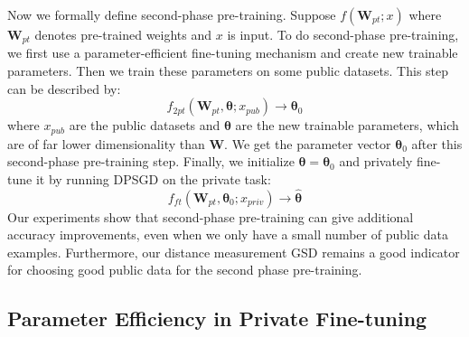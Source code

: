 \documentclass[11pt]{article}
\renewcommand{\epsilon}{\varepsilon}
\begin{document}
Now we formally define second-phase pre-training. Suppose $f(\mathbf{W}_{pt}; x)$ where $\mathbf{W}_{pt}$ denotes pre-trained weights and $x$ is input. To do second-phase pre-training, we first use a parameter-efficient fine-tuning mechanism and create new trainable parameters. Then we train these parameters on some public datasets. This step can be described by:
\begin{equation}
    f_{2pt}\left(\mathbf{W}_{pt}, \mathbf{\theta}; x_{pub}\right) \rightarrow \mathbf{\theta}_0
\end{equation}
where $x_{pub}$ are the public datasets and $\mathbf{\theta}$ are the new trainable parameters, which are of far lower dimensionality than $\mathbf{W}$. We get the parameter vector $\mathbf{\theta}_0$ after this second-phase pre-training step. Finally, we initialize $\mathbf{\theta} = \mathbf{\theta}_0$ and privately fine-tune it by running DPSGD on the private task:
\begin{equation}
    f_{ft}\left(\mathbf{W}_{pt}, \mathbf{\theta}_0; x_{priv}\right) \rightarrow \hat{\mathbf{\theta}}
\end{equation}
Our experiments show that second-phase pre-training can give additional accuracy improvements, even when we only have a small number of public data examples. Furthermore, our distance measurement GSD remains a good indicator for choosing good public data for the second phase pre-training. 



\subsection{Parameter Efficiency in Private Fine-tuning}





\iffalse
Implementing DP entails adding noise sampled from a spherical Gaussian distribution to the gradients at each iteration, thereby affecting the information conveyed by the gradients. Formally, the excess risk achieves $O(\frac{\sqrt{p}}{\epsilon})$\cite{dpsgd3}, where $p$ is the number of model parameters. Larger models, which have more parameters, are better at learning stronger representations but also introduce greater noise to maintain DP. To mitigate this, it is common practice in private machine learning to make use of pre-training and fine-tune only a smaller number of parameters privately.
\fi
\end{document}
